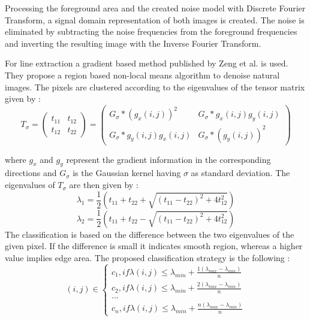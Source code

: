 \documentclass[draft,final]{vutinfth} %
\begin{document}
Processing the foreground area and the created noise model with Discrete Fourier Transform, a signal domain representation  of both images is created.
The noise is eliminated by subtracting the noise frequencies from the foreground frequencies and inverting the resulting image with the Inverse Fourier Transform.
\par
For line extraction a gradient based method published by Zeng et al. \cite{zeng2011region} is used.
They propose a region based non-local means algorithm to denoise natural images.
The pixels are clustered according to the eigenvalues of the tensor matrix given by \cite{zeng2011region}:
\[T_\sigma = 
\begin{pmatrix}
t_{11} & t_{12} \\
t_{12} & t_{22}
\end{pmatrix}
=
\begin{pmatrix}
G_\sigma*(g_x(i,j))^2 & G_{\sigma}*g_x(i, j)g_y(i, j)\\
G_{\sigma}*g_y(i, j)g_x(i, j) & G_{\sigma}*(g_y(i, j))^2
\end{pmatrix}
\]

where $g_x$ and $g_y$ represent the gradient information in the corresponding directions and $G_\sigma$ is the Gaussian kernel having $\sigma$ as standard deviation.
The eigenvalues of $T_\sigma$ are then given by \cite{zeng2011region}:
\[\lambda_1 = \frac{1}{2}(t_{11} + t_{22} + \sqrt{(t_{11}-t_{22})^2 + 4t_{12}^2})\]  
\[\lambda_2 = \frac{1}{2}(t_{11} + t_{22} - \sqrt{(t_{11}-t_{22})^2 + 4t_{12}^2})\]  
\label{eig}
The classification is based on the difference between the two eigenvalues of the given pixel.
If the difference is small it indicates smooth region, whereas a higher value implies edge area.
The proposed classification strategy is the following \cite{zeng2011region}:
\[
(i, j)\in \left\{
                \begin{array}{ll}
                  c_1, if \lambda(i,j) \leq \lambda_{min} + \frac{1(\lambda_{max} - \lambda_{min})}{n}\\
                  c_2, if \lambda(i,j) \leq \lambda_{min} + \frac{2(\lambda_{max} - \lambda_{min})}{n}\\
				... \\
                   c_n, if \lambda(i,j) \leq \lambda_{min} + \frac{n(\lambda_{max} - \lambda_{min})}{n}
                \end{array}
              \right.
\]
\end{document}
